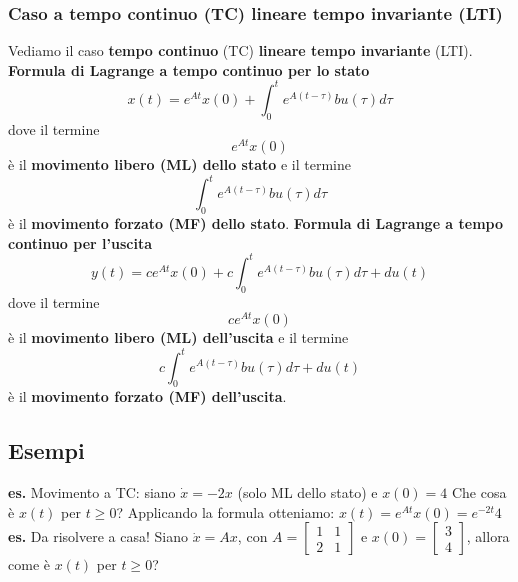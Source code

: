 \subsubsection{Caso a tempo continuo (TC) lineare tempo invariante (LTI)}
Vediamo il caso \textbf{tempo continuo} (TC) \textbf{lineare tempo invariante} (LTI).\newline
\textbf{Formula di Lagrange a tempo continuo per lo stato}
\[
    x(t) = e^{At}x(0) + \int_{0}^{t}e^{A(t-\tau)}bu(\tau)d \tau
\]
dove il termine
\[
    e^{At}x(0)
\] è il \textbf{movimento libero (ML) dello stato} e il termine
\[
    \int_{0}^{t}e^{A(t-\tau)}bu(\tau)d \tau
\] è il \textbf{movimento forzato (MF) dello stato}.\newline
\newline
\textbf{Formula di Lagrange a tempo continuo per l'uscita}
\[
    y(t) = c e^{At}x(0) + c\int_{0}^{t}e^{A(t-\tau)}bu(\tau)d \tau + du(t)
\]
dove il termine
\[
    ce^{At}x(0)
\]
è il \textbf{movimento libero (ML) dell'uscita} e il termine
\[
    c\int_{0}^{t}e^{A(t-\tau)}bu(\tau)d \tau + du(t)
\] 
è il \textbf{movimento forzato (MF) dell'uscita}.
\subsection{Esempi}
\textbf{es.} Movimento a TC:\newline
siano\newline
$\dot{x} = -2x$ (solo ML dello stato) e $x(0) = 4$\newline
Che cosa è $x(t)$ per $t\geq 0$?\newline
Applicando la formula otteniamo: $x(t) = e^{At}x(0) = e^{-2t}4$\newline
\newline
\textbf{es.} Da risolvere a casa!\newline
Siano $\dot{x} = Ax$, con $A = \left[\begin{matrix}
    1&1\\
    2&1
\end{matrix}\right]$ e $x(0) = \left[\begin{matrix}
    3\\
    4
\end{matrix}\right]$, allora come è $x(t)$ per $t\geq 0$?
